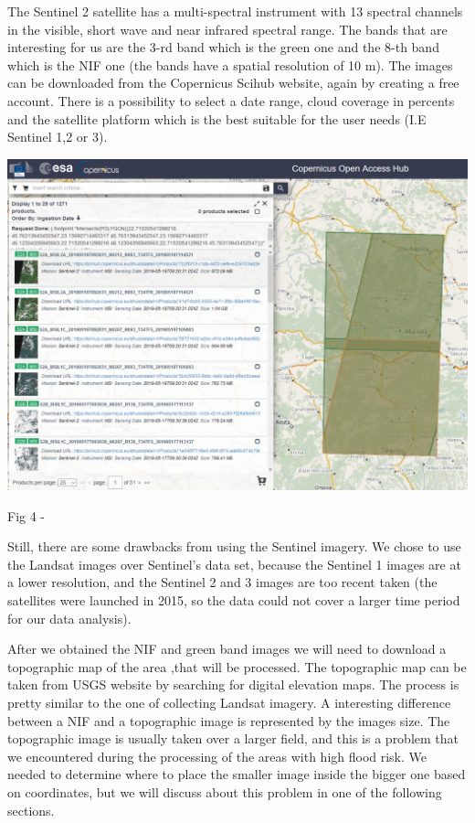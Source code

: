 \documentclass[12pt, a4paper]{report}
\begin{document}
The Sentinel 2 satellite has a multi-spectral instrument with 13 spectral channels in the visible, short wave and near infrared spectral range. The bands that are interesting for us are the 3-rd band which is the green one and the 8-th band which is the NIF one (the bands have a spatial resolution of 10 m). The images  can be downloaded from the Copernicus Scihub website, again by creating a free account. There is a possibility to select a date range, cloud coverage in percents and the satellite platform which is the best suitable for the user needs (I.E Sentinel 1,2 or 3). 
\par 

\bigskip

\includegraphics[scale=0.54, center]{sentinel.png} 
\begin{center}
Fig 4 - \cite{22}
\end{center}
\par 


Still, there are some drawbacks from using the Sentinel imagery. We chose to use the Landsat images over Sentinel's data set, because the Sentinel 1 images are at a lower resolution, and the Sentinel 2 and 3 images are too recent taken (the satellites were launched in 2015, so the data could not cover a larger time period for our data analysis).
\par 

After we obtained the NIF and green band images we will need to download a topographic map of the area ,that will be processed. The topographic map can be taken from USGS website by searching for digital elevation maps. The process is pretty similar to the one of collecting Landsat imagery. A interesting difference between a NIF and a topographic image is represented by the images size. The topographic image is usually taken over a larger field, and this is a problem that we encountered during the processing of the areas with high flood risk. We needed to determine where to place the smaller image inside the bigger one based on coordinates, but we will discuss about this problem in one of the following sections.
\par
\end{document}
